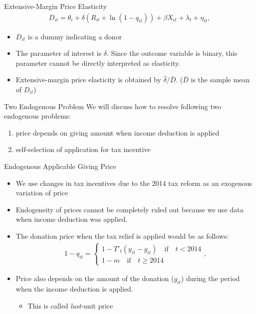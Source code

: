\documentclass[
  ignorenonframetext,
  aspectratio=169,
]{beamer}
\providecommand{\tightlist}{%
  \setlength{\itemsep}{0pt}\setlength{\parskip}{0pt}}
\begin{document}
\begin{frame}{Extensive-Margin Price Elasticity}
\protect\hypertarget{extensive-margin-price-elasticity}{}
\begin{align}
  D_{it} = \theta_i + \delta (R_{it} \times \ln (1 - q_{it}))
    + \beta X_{it} + \lambda_t + \eta_{it}, \label{eq:extensive}
\end{align}

\begin{itemize}
\tightlist
\item
  \(D_{it}\) is a dummy indicating a donor
\item
  The parameter of interest is \(\delta\). Since the outcome variable is binary, this parameter cannot be directly interpreted as elasticity.
\item
  Extensive-margin price elasticity is obtained by \(\hat{\delta} / \bar{D}\). (\(\bar{D}\) is the sample mean of \(D_{it}\))
\end{itemize}
\end{frame}

\begin{frame}{Two Endogenous Problem}
\protect\hypertarget{two-endogenous-problem}{}
We will discuss how to resolve following two endogenous problems:

\begin{enumerate}
\tightlist
\item
  price depends on giving amount when income deduction is applied
\item
  self-selection of application for tax incentive
\end{enumerate}
\end{frame}

\begin{frame}{Endogenous Applicable Giving Price}
\protect\hypertarget{endogenous-applicable-giving-price}{}
\begin{itemize}
\item
  We use changes in tax incentives due to the 2014 tax reform as an exogenous variation of price
\item
  Endogeneity of prices cannot be completely ruled out because we use data when income deduction was applied.
\item
  The donation price when the tax relief is applied would be as follows:
  \begin{align}
  1 - q_{it} =
  \begin{cases}
    1 - T'_t(y_{it} - g_{it})  \quad\text{if}\quad t < 2014  \\
    1 - m \quad\text{if}\quad t \ge 2014
  \end{cases},
  \end{align}
\item
  Price also depends on the amount of the donation (\(g_{it}\)) during the period when the income deduction is applied.

  \begin{itemize}
  \tightlist
  \item
    This is called \emph{last}-unit price
  \end{itemize}
\end{itemize}
\end{frame}
\end{document}
